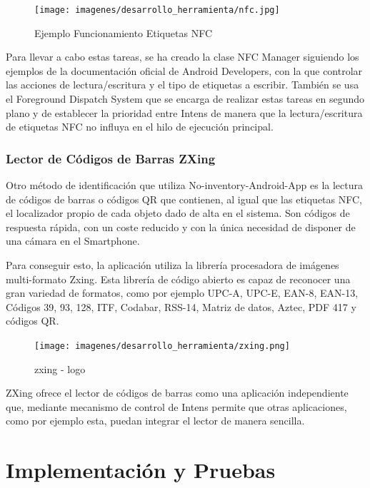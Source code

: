 \documentclass[a4paper,11pt]{book}
\begin{document}
\begin{figure}[H] 
\centering 
\texttt{[image: imagenes/desarrollo\_herramienta/nfc.jpg]}
\caption{ Ejemplo Funcionamiento Etiquetas NFC\cite{nfc4}}
\end{figure}

Para llevar a cabo estas tareas, se ha creado la clase NFC Manager siguiendo los ejemplos de la documentación oficial de Android Developers\cite{nfc2}, con la que controlar las acciones de lectura/escritura y el tipo de etiquetas a escribir. También se usa el Foreground Dispatch System\cite{nfc3} que se encarga de realizar estas tareas en segundo plano  y de establecer la prioridad entre Intens de manera que la lectura/escritura de etiquetas NFC no influya en el hilo de ejecución principal. 


 

\subsection{Lector de Códigos de Barras ZXing}

Otro método de identificación que utiliza  No-inventory-Android-App es la lectura de códigos de barras o códigos QR que contienen, al igual que las etiquetas NFC, el localizador propio de cada objeto dado de alta en el sistema. Son códigos de respuesta rápida, con un coste reducido y con la única necesidad de disponer de una cámara en el Smartphone. 

Para conseguir esto, la aplicación utiliza la librería procesadora de imágenes multi-formato Zxing\cite{cebra}. Esta librería de código abierto  es capaz de reconocer una gran variedad de formatos, como por ejemplo  UPC-A, UPC-E, EAN-8, EAN-13, Códigos 39, 93, 128, ITF, Codabar, RSS-14, Matriz de datos, Aztec, PDF 417 y códigos QR. 

\begin{figure}[H] 
\centering 
\texttt{[image: imagenes/desarrollo\_herramienta/zxing.png]}
\caption{ zxing - logo\cite{cebra3}}
\end{figure}

ZXing ofrece el lector de códigos de barras como una aplicación independiente que, mediante mecanismo de control de Intens\cite{cebra2} permite que otras aplicaciones, como por ejemplo esta,  puedan integrar el lector de manera sencilla.




\chapter{Implementación y Pruebas}
\end{document}

